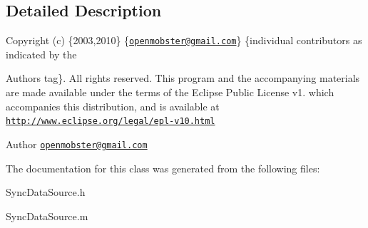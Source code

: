 \subsection{\-Detailed \-Description}
\-Copyright (c) \{2003,2010\} \{\href{mailto:openmobster@gmail.com}{\tt openmobster@gmail.\-com}\} \{individual contributors as indicated by the \begin{DoxyAuthor}{\-Authors}
tag\}. \-All rights reserved. \-This program and the accompanying materials are made available under the terms of the \-Eclipse \-Public \-License v1. which accompanies this distribution, and is available at \href{http://www.eclipse.org/legal/epl-v10.html}{\tt http\-://www.\-eclipse.\-org/legal/epl-\/v10.\-html}
\end{DoxyAuthor}
\begin{DoxyAuthor}{\-Author}
\href{mailto:openmobster@gmail.com}{\tt openmobster@gmail.\-com} 
\end{DoxyAuthor}


\-The documentation for this class was generated from the following files\-:\begin{DoxyCompactItemize}
\item 
\-Sync\-Data\-Source.\-h\item 
\-Sync\-Data\-Source.\-m\end{DoxyCompactItemize}
